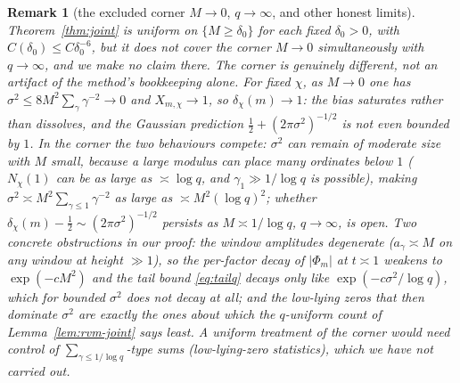 \documentclass[11pt]{article}
\newtheorem{remark}{Remark}
\begin{document}
\begin{remark}[the excluded corner $M\to0$, $q\to\infty$, and other
honest limits]\label{rem:joint-corner}
Theorem~\ref{thm:joint} is uniform on $\{M\ge\delta_0\}$ for each
fixed $\delta_0>0$, with $C(\delta_0)\le C\delta_0^{-6}$, but it does
\emph{not} cover the corner $M\to0$ simultaneously with $q\to\infty$,
and we make no claim there. The corner is genuinely different, not an
artifact of the method's bookkeeping alone. For fixed $\chi$, as
$M\to0$ one has $\sigma^2\le8M^2\sum_\gamma\gamma^{-2}\to0$ and
$X_{m,\chi}\to1$, so $\delta_\chi(m)\to1$: the bias \emph{saturates}
rather than dissolves, and the Gaussian prediction
$\tfrac12+(2\pi\sigma^2)^{-1/2}$ is not even bounded by $1$. In the
corner the two behaviours compete: $\sigma^2$ can remain of moderate
size with $M$ small, because a large modulus can place many ordinates
below $1$ ($N_\chi(1)$ can be as large as $\asymp\log q$, and
$\gamma_1\gg1/\log q$ is possible), making
$\sigma^2\asymp M^2\sum_{\gamma\le1}\gamma^{-2}$ as large as
$\asymp M^2(\log q)^2$; whether
$\delta_\chi(m)-\tfrac12\sim(2\pi\sigma^2)^{-1/2}$ persists as
$M\asymp1/\log q$, $q\to\infty$, is open. Two concrete obstructions in
our proof: the window amplitudes degenerate ($a_\gamma\asymp M$ on any
window at height $\gg1$), so the per-factor decay of $|\Phi_m|$ at
$t\asymp1$ weakens to $\exp(-cM^2)$ and the tail bound
\eqref{eq:tailq} decays only like $\exp(-c\sigma^2/\log q)$, which for
bounded $\sigma^2$ does not decay at all; and the low-lying zeros that
then dominate $\sigma^2$ are exactly the ones about which the
$q$-uniform count of Lemma~\ref{lem:rvm-joint} says least. A uniform
treatment of the corner would need control of
$\sum_{\gamma\le1/\log q}$-type sums (low-lying-zero statistics),
which we have not carried out.
\end{remark}
\end{document}
